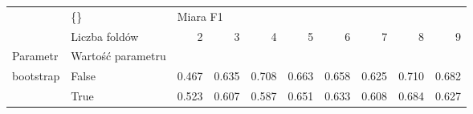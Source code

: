 \begin{tabular}{llrrrrrrrr}
\hline
          & \{\} & \multicolumn{8}{l}{Miara F1} \\
          & Liczba foldów &        2 &      3 &      4 &      5 &      6 &      7 &      8 &      9 \\
Parametr & Wartość parametru &          &        &        &        &        &        &        &        \\
\hline
bootstrap & False &    0.467 &  0.635 &  0.708 &  0.663 &  0.658 &  0.625 &  0.710 &  0.682 \\
          & True &    0.523 &  0.607 &  0.587 &  0.651 &  0.633 &  0.608 &  0.684 &  0.627 \\
\hline
\end{tabular}
